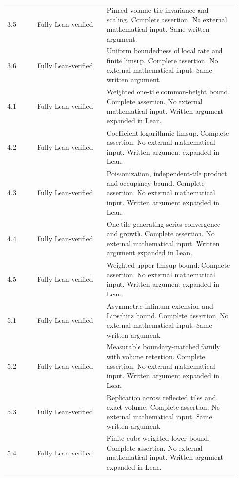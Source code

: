 \begin{longtable}{@{}p{0.12\linewidth}p{0.29\linewidth}p{0.53\linewidth}@{}}
3.5 & Fully Lean-verified & Pinned volume tile invariance and scaling. Complete assertion. No external mathematical input. Same written argument. \\

3.6 & Fully Lean-verified & Uniform boundedness of local rate and finite limsup. Complete assertion. No external mathematical input. Same written argument. \\

4.1 & Fully Lean-verified & Weighted one-tile common-height bound. Complete assertion. No external mathematical input. Written argument expanded in Lean. \\

4.2 & Fully Lean-verified & Coefficient logarithmic limsup. Complete assertion. No external mathematical input. Written argument expanded in Lean. \\

4.3 & Fully Lean-verified & Poissonization, independent-tile product and occupancy bound. Complete assertion. No external mathematical input. Written argument expanded in Lean. \\

4.4 & Fully Lean-verified & One-tile generating series convergence and growth. Complete assertion. No external mathematical input. Written argument expanded in Lean. \\

4.5 & Fully Lean-verified & Weighted upper limsup bound. Complete assertion. No external mathematical input. Written argument expanded in Lean. \\

5.1 & Fully Lean-verified & Asymmetric infimum extension and Lipschitz bound. Complete assertion. No external mathematical input. Same written argument. \\

5.2 & Fully Lean-verified & Measurable boundary-matched family with volume retention. Complete assertion. No external mathematical input. Written argument expanded in Lean. \\

5.3 & Fully Lean-verified & Replication across reflected tiles and exact volume. Complete assertion. No external mathematical input. Same written argument. \\

5.4 & Fully Lean-verified & Finite-cube weighted lower bound. Complete assertion. No external mathematical input. Written argument expanded in Lean. \\


\end{longtable}

